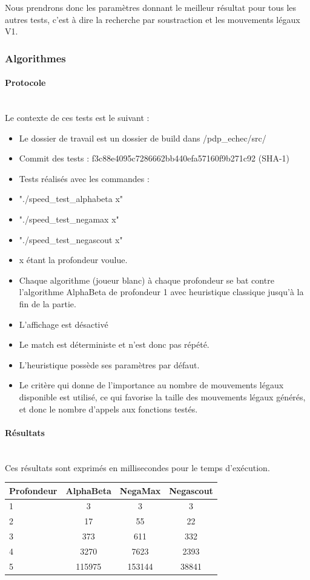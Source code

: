 \documentclass{article}
\begin{document}
Nous prendrons donc les paramètres donnant le meilleur résultat pour tous les autres tests, c'est à dire la recherche par soustraction et les mouvements légaux V1.

\subsubsection{Algorithmes}
\paragraph{Protocole}
~~\\
\newline
Le contexte de ces tests est le suivant :
\begin{itemize}
    \item Le dossier de travail est un dossier de build dans /pdp\_echec/src/
    \item Commit des tests  : f3c88e4095c7286662bb440efa57160f9b271c92 (SHA-1)
    \item Tests réalisés avec les commandes : 
    \item "./speed\_test\_alphabeta x"
    \item "./speed\_test\_negamax x"
    \item "./speed\_test\_negascout x"
    \item x étant la profondeur voulue.
    \item Chaque algorithme (joueur blanc) à chaque profondeur se bat contre l'algorithme AlphaBeta de profondeur 1 avec heuristique classique jusqu'à la fin de la partie.
    \item L'affichage est désactivé
    \item Le match est déterministe et n'est donc pas répété.
    \item L'heuristique possède ses paramètres par défaut.
    \item Le critère qui donne de l'importance au nombre de mouvements légaux disponible est utilisé, ce qui favorise la taille des mouvements légaux générés, et donc le nombre d'appels aux fonctions testés.
\end{itemize}
\paragraph{Résultats}
~~\\
\newline
Ces résultats sont exprimés en millisecondes pour le temps d'exécution.
\begin{center}
   \begin{tabular}{ | l | c | c | c | }
     \hline
     Profondeur & AlphaBeta & NegaMax & Negascout \\ \hline
     1  & 3 & 3 & 3 \\ \hline
     2  & 17 & 55 & 22\\ \hline
     3  & 373 & 611 & 332\\ \hline
     4  & 3270 & 7623 & 2393\\ \hline
     5  & 115975 & 153144 & 38841\\ 
     \hline
   \end{tabular}
\end{center}
\end{document}
